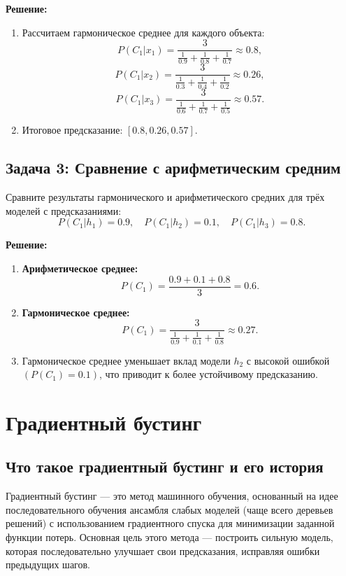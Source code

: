\textbf{Решение:}
\begin{enumerate}
    \item Рассчитаем гармоническое среднее для каждого объекта:
    \[
    P(C_1 | x_1) = \frac{3}{\frac{1}{0.9} + \frac{1}{0.8} + \frac{1}{0.7}} \approx 0.8,
    \]
    \[
    P(C_1 | x_2) = \frac{3}{\frac{1}{0.3} + \frac{1}{0.4} + \frac{1}{0.2}} \approx 0.26,
    \]
    \[
    P(C_1 | x_3) = \frac{3}{\frac{1}{0.6} + \frac{1}{0.7} + \frac{1}{0.5}} \approx 0.57.
    \]
    \item Итоговое предсказание: \( [0.8, 0.26, 0.57] \).
\end{enumerate}

\subsection*{Задача 3: Сравнение с арифметическим средним}

Сравните результаты гармонического и арифметического средних для трёх моделей с предсказаниями:
\[
P(C_1 | h_1) = 0.9, \quad P(C_1 | h_2) = 0.1, \quad P(C_1 | h_3) = 0.8.
\]

\textbf{Решение:}
\begin{enumerate}
    \item \textbf{Арифметическое среднее:}
    \[
    P(C_1) = \frac{0.9 + 0.1 + 0.8}{3} = 0.6.
    \]
    \item \textbf{Гармоническое среднее:}
    \[
    P(C_1) = \frac{3}{\frac{1}{0.9} + \frac{1}{0.1} + \frac{1}{0.8}} \approx 0.27.
    \]
    \item Гармоническое среднее уменьшает вклад модели \( h_2 \) с высокой ошибкой \( (P(C_1) = 0.1) \), что приводит к более устойчивому предсказанию.
\end{enumerate}

\section{Градиентный бустинг}

\subsection{Что такое градиентный бустинг и его история}

Градиентный бустинг — это метод машинного обучения, основанный на идее последовательного обучения ансамбля слабых моделей (чаще всего деревьев решений) с использованием градиентного спуска для минимизации заданной функции потерь. Основная цель этого метода — построить сильную модель, которая последовательно улучшает свои предсказания, исправляя ошибки предыдущих шагов.

